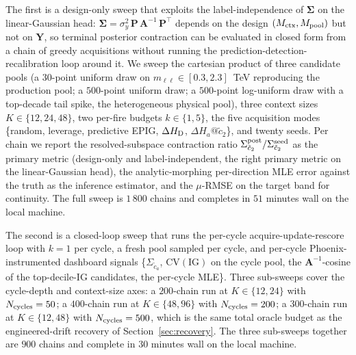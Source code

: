 \documentclass[11pt,a4paper]{article}
\newcommand{\mll}{m_{\ell\ell}}
\begin{document}
The first is a design-only sweep that exploits the label-independence of $\bm{\Sigma}$ on the linear-Gaussian head: $\bm{\Sigma} = \sigma_y^2\,\bm{P}\,\bm{A}^{-1}\,\bm{P}^\top$ depends on the design $(M_{\rm ctx}, M_{\rm pool})$ but not on $\bm{Y}$, so terminal posterior contraction can be evaluated in closed form from a chain of greedy acquisitions without running the prediction-detection-recalibration loop around it. We sweep the cartesian product of three candidate pools (a $30$-point uniform draw on $\mll \in [0.3, 2.3]$~TeV reproducing the production pool; a $500$-point uniform draw; a $500$-point log-uniform draw with a top-decade tail spike, the heterogeneous physical pool), three context sizes $K \in \{12, 24, 48\}$, two per-fire budgets $k \in \{1, 5\}$, the five acquisition modes \{random, leverage, predictive EPIG, $\Delta H_{\rm D}$, $\Delta H_a@\tilde c_2$\}, and twenty seeds. Per chain we report the resolved-subspace contraction ratio $\Sigma_{\tilde c_2}^{\rm post} / \Sigma_{\tilde c_2}^{\rm seed}$ as the primary metric (design-only and label-independent, the right primary metric on the linear-Gaussian head), the analytic-morphing per-direction MLE error against the truth as the inference estimator, and the $\mu$-RMSE on the target band for continuity. The full sweep is $1\,800$ chains and completes in $51$ minutes wall on the local machine.

The second is a closed-loop sweep that runs the per-cycle acquire-update-rescore loop with $k=1$ per cycle, a fresh pool sampled per cycle, and per-cycle Phoenix-instrumented dashboard signals \{$\Sigma_{\tilde c_a}$, $\mathrm{CV}(\mathrm{IG})$ on the cycle pool, the $\bm{A}^{-1}$-cosine of the top-decile-IG candidates, the per-cycle MLE\}. Three sub-sweeps cover the cycle-depth and context-size axes: a $200$-chain run at $K \in \{12, 24\}$ with $N_{\rm cycles} = 50$; a $400$-chain run at $K \in \{48, 96\}$ with $N_{\rm cycles} = 200$; a $300$-chain run at $K \in \{12, 48\}$ with $N_{\rm cycles} = 500$, which is the same total oracle budget as the engineered-drift recovery of Section~\ref{sec:recovery}. The three sub-sweeps together are $900$ chains and complete in $30$ minutes wall on the local machine.
\end{document}
